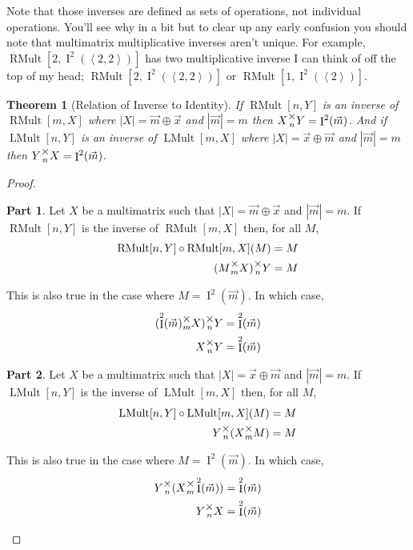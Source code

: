 \documentclass[12pt]{book}
\theoremstyle{plain}
\newtheorem{theorem}{Theorem}[chapter]
\theoremstyle{definition}
\theoremstyle{ppart}
\newtheorem{ppart}{Part}
\theoremstyle{case}
\theoremstyle{solution}
\DeclareMathOperator{\Ident}{I}
\DeclareMathOperator{\RMult}{RMult}
\DeclareMathOperator{\LMult}{LMult}
\newcommand{\mmult}[1]{\text{\raisebox{1ex}{$\underset{#1}{\times}$}}}
\newcommand{\shape}[1]{\left|#1\right|}
\begin{document}
Note that those inverses are defined as sets of operations, not individual operations. 
You'll see why in a bit but to clear up any early confusion you should note that multimatrix
multiplicative inverses aren't unique. For example, $\RMult[2,\Ident^2(\left<2,2\right>)]$ has
two multiplicative inverse I can think of off the top of my head;
$\RMult[2,\Ident^2(\left<2,2\right>)]$ or
$\RMult[1,\Ident^2(\left<2\right>)]$.

\begin{theorem}[Relation of Inverse to Identity]
If $\RMult[n,Y]$ is an inverse of $\RMult[m,X]$ where $\shape{X} = \vec{m} \oplus \vec{x}$ and $\shape{\vec{m}} = m$
then $X \mmult{n} Y = \Ident^2(\vec{m})$.
And if $\LMult[n,Y]$ is an inverse of $\LMult[m,X]$ where $\shape{X} = \vec{x} \oplus \vec{m}$ and $\shape{\vec{m}} = m$
then $Y \mmult{n} X = \Ident^2(\vec{m})$.
\end{theorem}
\begin{proof}
\begin{ppart}
Let $X$ be a multimatrix such that $\shape{X} = \vec{m} \oplus \vec{x}$ and $\shape{\vec{m}} = m$.
If $\RMult[n,Y]$ is the inverse of $\RMult[m,X]$ then, for all $M$,
\begin{align*}
  \RMult[n,Y] \circ \RMult[m,X] (M) &= M \\
  (M \mmult{m} X) \mmult{n} Y &= M
\end{align*}

This is also true in the case where $M = \Ident^2(\vec{m})$. In which case,
\begin{align*}
  (\Ident^2(\vec{m}) \mmult{m} X) \mmult{n} Y &= \Ident^2(\vec{m}) \\
  X \mmult{n} Y &= \Ident^2(\vec{m}) \\
\end{align*}
\end{ppart}
\begin{ppart}
Let $X$ be a multimatrix such that $\shape{X} = \vec{x} \oplus \vec{m}$ and $\shape{\vec{m}} = m$.
If $\LMult[n,Y]$ is the inverse of $\LMult[m,X]$ then, for all $M$,
\begin{align*}
  \LMult[n,Y] \circ \LMult[m,X] (M) &= M \\
  Y \mmult{n} (X \mmult{m} M) &= M
\end{align*}

This is also true in the case where $M = \Ident^2(\vec{m})$. In which case,
\begin{align*}
  Y \mmult{n} (X \mmult{m} \Ident^2(\vec{m})) &= \Ident^2(\vec{m}) \\
  Y \mmult{n} X &= \Ident^2(\vec{m})
\end{align*}
\end{ppart}
\end{proof}
\end{document}
